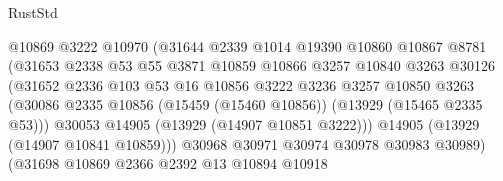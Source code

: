 \begin{lexlean}{RustStd}
\begin{coremodule}
                                    @10869
                                    @3222
                                    @10970
                                    (@31644
                                      @2339
                                      @1014
                                      @19390
                                      @10860
                                      @10867
                                      @8781
                                      (@31653
                                        @2338
                                        @53
                                        @55
                                        @3871
                                        @10859
                                        @10866
                                        @3257
                                        @10840
                                        @3263
                                        @30126
                                        (@31652
                                          @2336
                                          @103
                                          @53
                                          @16
                                          @10856
                                          @3222
                                          @3236
                                          @3257
                                          @10850
                                          @3263
                                          (@30086
                                            @2335
                                            @10856
                                            (@15459 (@15460 @10856))
                                            (@13929 (@15465 @2335 @53)))
                                          @30053
                                          @14905
                                          (@13929 (@14907 @10851 @3222)))
                                        @14905
                                        (@13929 (@14907 @10841 @10859)))
                                      @30968
                                      @30971
                                      @30974
                                      @30978
                                      @30983
                                      @30989)
                                    (@31698
                                      @10869
                                      @2366
                                      @2392
                                      @13
                                      @10894
                                      @10918

\end{coremodule}
\end{lexlean}

